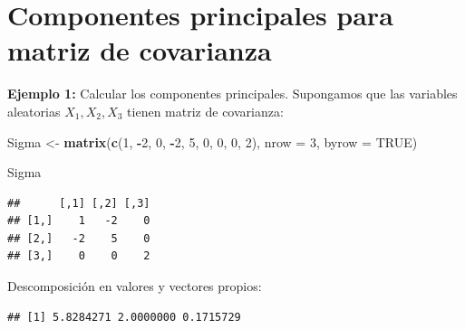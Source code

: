 \documentclass[
]{book}
\newenvironment{Shaded}{\begin{snugshade}}{\end{snugshade}}
\newcommand{\AttributeTok}[1]{\textcolor[rgb]{0.13,0.29,0.53}{#1}}
\newcommand{\CommentTok}[1]{\textcolor[rgb]{0.56,0.35,0.01}{\textit{#1}}}
\newcommand{\ConstantTok}[1]{\textcolor[rgb]{0.56,0.35,0.01}{#1}}
\newcommand{\DecValTok}[1]{\textcolor[rgb]{0.00,0.00,0.81}{#1}}
\newcommand{\FunctionTok}[1]{\textcolor[rgb]{0.13,0.29,0.53}{\textbf{#1}}}
\newcommand{\NormalTok}[1]{#1}
\newcommand{\OtherTok}[1]{\textcolor[rgb]{0.56,0.35,0.01}{#1}}
\newcommand{\SpecialCharTok}[1]{\textcolor[rgb]{0.81,0.36,0.00}{\textbf{#1}}}
\begin{document}
\section{Componentes principales para matriz de covarianza}\label{componentes-principales-para-matriz-de-covarianza}

\textbf{Ejemplo 1:} Calcular los componentes principales. Supongamos que las variables aleatorias \(X_1, X_2, X_3\) tienen matriz de covarianza:

\begin{Shaded}
\begin{Highlighting}[]
\NormalTok{Sigma }\OtherTok{\textless{}{-}} \FunctionTok{matrix}\NormalTok{(}\FunctionTok{c}\NormalTok{(}\DecValTok{1}\NormalTok{, }\SpecialCharTok{{-}}\DecValTok{2}\NormalTok{, }\DecValTok{0}\NormalTok{,}
                  \SpecialCharTok{{-}}\DecValTok{2}\NormalTok{, }\DecValTok{5}\NormalTok{, }\DecValTok{0}\NormalTok{,}
                  \DecValTok{0}\NormalTok{,  }\DecValTok{0}\NormalTok{, }\DecValTok{2}\NormalTok{),}
                \AttributeTok{nrow =} \DecValTok{3}\NormalTok{, }\AttributeTok{byrow =} \ConstantTok{TRUE}\NormalTok{)}

\NormalTok{Sigma}
\end{Highlighting}
\end{Shaded}

\begin{verbatim}
##      [,1] [,2] [,3]
## [1,]    1   -2    0
## [2,]   -2    5    0
## [3,]    0    0    2
\end{verbatim}

Descomposición en valores y vectores propios:

\begin{Shaded}
\end{Shaded}

\begin{verbatim}
## [1] 5.8284271 2.0000000 0.1715729
\end{verbatim}

\begin{Shaded}
\end{Shaded}
\end{document}
